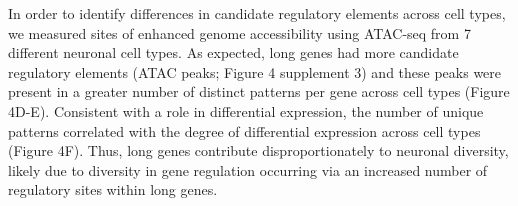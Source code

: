 In order to identify differences in candidate regulatory elements across cell types, we measured sites of enhanced genome accessibility using ATAC-seq \cite{Buenrostro_2013} from 7 different neuronal cell types. As expected, long genes had more candidate regulatory elements (ATAC peaks; Figure 4 supplement 3) and these peaks were present in a greater number of distinct patterns per gene across cell types (Figure 4D-E). Consistent with a role in differential expression, the number of unique patterns correlated with the degree of differential expression across cell types (Figure 4F). Thus, long genes contribute disproportionately to neuronal diversity, likely due to diversity in gene regulation occurring via an increased number of regulatory sites within long genes. 


